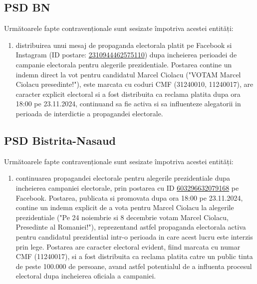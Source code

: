 \documentclass[a4paper,12pt]{article}
\begin{document}
\vspace{0.5cm}

\subsection{PSD BN}
Următoarele fapte contravenționale sunt sesizate împotriva acestei entități:

\begin{enumerate}[leftmargin=*, label=\arabic*.)]
    \item distribuirea unui mesaj de propaganda electorala platit pe Facebook si Instagram (ID postare: \href{https://www.facebook.com/ads/library/?id=2310944462575110}{2310944462575110}) dupa incheierea perioadei de campanie electorala pentru alegerile prezidentiale. Postarea contine un indemn direct la vot pentru candidatul Marcel Ciolacu ("VOTAM Marcel Ciolacu presedinte!"), este marcata cu coduri CMF (31240010, 11240017), are caracter explicit electoral si a fost distribuita ca reclama platita dupa ora 18:00 pe 23.11.2024, continuand sa fie activa si sa influenteze alegatorii in perioada de interdictie a propagandei electorale.
\end{enumerate}

\vspace{0.5cm}

\subsection{PSD Bistrita-Nasaud}
Următoarele fapte contravenționale sunt sesizate împotriva acestei entități:

\begin{enumerate}[leftmargin=*, label=\arabic*.)]
    \item continuarea propagandei electorale pentru alegerile prezidentiale dupa incheierea campaniei electorale, prin postarea cu ID \href{https://www.facebook.com/ads/library/?id=603296632079168}{603296632079168} pe Facebook. Postarea, publicata si promovata dupa ora 18:00 pe 23.11.2024, contine un indemn explicit de a vota pentru Marcel Ciolacu la alegerile prezidentiale ("Pe 24 noiembrie si 8 decembrie votam  Marcel Ciolacu, Presedinte al Romaniei!"), reprezentand astfel propaganda electorala activa pentru candidatul prezidential intr-o perioada in care acest lucru este interzis prin lege. Postarea are caracter electoral evident, fiind marcata cu numar CMF (11240017), si a fost distribuita ca reclama platita catre un public tinta de peste 100.000 de persoane, avand astfel potentialul de a influenta procesul electoral dupa incheierea oficiala a campaniei.
\end{enumerate}
\end{document}
